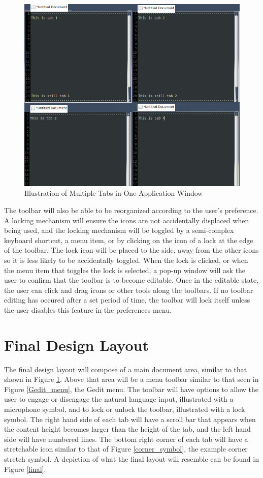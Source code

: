 \documentclass[11pt, oneside]{article}
\begin{document}
\begin{figure}
    \centering
    \includegraphics[width=.8\textwidth]{photos/multitasking_tabs.png}
    \caption{Illustration of Multiple Tabs in One Application Window}
    \label{multitasking_tabs}
\end{figure}

The toolbar will also be able to be reorganized according to the user's preference. A locking mechanism will ensure the icons are not accidentally displaced when being used, and the locking mechanism will be toggled by a semi-complex keyboard shortcut, a menu item, or by clicking on the icon of a lock at the edge of the toolbar. The lock icon will be placed to the side, away from the other icons so it is less likely to be accidentally toggled. When the lock is clicked, or when the menu item that toggles the lock is selected, a pop-up window will ask the user to confirm that the toolbar is to become editable. Once in the editable state, the user can click and drag icons or other tools along the toolbars. If no toolbar editing has occured after a set period of time, the toolbar will lock itself unless the user disables this feature in the preferences menu. 

\section{Final Design Layout}
The final design layout will compose of a main document area, similar to that shown in Figure \ref{multitasking_tabs}. Above that area will be a menu toolbar similar to that seen in Figure \ref{Gedit_menu}, the Gedit menu. The toolbar will have options to allow the user to engage or disengage the natural language input, illustrated with a microphone symbol, and to lock or unlock the toolbar, illustrated with a lock symbol. The right hand side of each tab will have a scroll bar that appears when the content height becomes larger than the height of the tab, and the left hand side will have numbered lines. The bottom right corner of each tab will have a stretchable icon similar to that of Figure \ref{corner_symbol}, the example corner stretch symbol. A depiction of what the final layout will resemble can be found in Figure \ref{final}.
\end{document}
